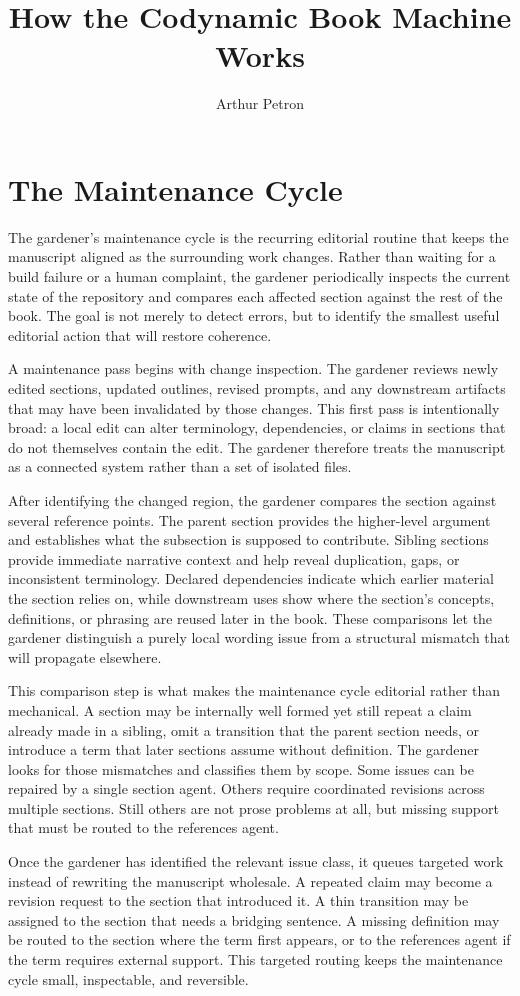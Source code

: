 \documentclass[11pt]{article}
\title{How the Codynamic Book Machine Works}
\author{Arthur Petron}
\begin{document}
\section*{The Maintenance Cycle}

The gardener's maintenance cycle is the recurring editorial routine that keeps the manuscript aligned as the surrounding work changes. Rather than waiting for a build failure or a human complaint, the gardener periodically inspects the current state of the repository and compares each affected section against the rest of the book. The goal is not merely to detect errors, but to identify the smallest useful editorial action that will restore coherence.

A maintenance pass begins with change inspection. The gardener reviews newly edited sections, updated outlines, revised prompts, and any downstream artifacts that may have been invalidated by those changes. This first pass is intentionally broad: a local edit can alter terminology, dependencies, or claims in sections that do not themselves contain the edit. The gardener therefore treats the manuscript as a connected system rather than a set of isolated files.

After identifying the changed region, the gardener compares the section against several reference points. The parent section provides the higher-level argument and establishes what the subsection is supposed to contribute. Sibling sections provide immediate narrative context and help reveal duplication, gaps, or inconsistent terminology. Declared dependencies indicate which earlier material the section relies on, while downstream uses show where the section's concepts, definitions, or phrasing are reused later in the book. These comparisons let the gardener distinguish a purely local wording issue from a structural mismatch that will propagate elsewhere.

This comparison step is what makes the maintenance cycle editorial rather than mechanical. A section may be internally well formed yet still repeat a claim already made in a sibling, omit a transition that the parent section needs, or introduce a term that later sections assume without definition. The gardener looks for those mismatches and classifies them by scope. Some issues can be repaired by a single section agent. Others require coordinated revisions across multiple sections. Still others are not prose problems at all, but missing support that must be routed to the references agent.

Once the gardener has identified the relevant issue class, it queues targeted work instead of rewriting the manuscript wholesale. A repeated claim may become a revision request to the section that introduced it. A thin transition may be assigned to the section that needs a bridging sentence. A missing definition may be routed to the section where the term first appears, or to the references agent if the term requires external support. This targeted routing keeps the maintenance cycle small, inspectable, and reversible.
\end{document}
